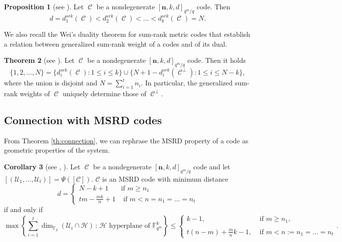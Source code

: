 \documentclass[11pt]{amsart}
\DeclareMathOperator{\C}{\mathcal{C}}
\theoremstyle{definition}
\newtheorem{theorem}{Theorem}[section]
\newtheorem{corollary}[theorem]{Corollary}
\newtheorem{proposition}[theorem]{Proposition}
\newcommand{\F}{{\mathbb F}}
\newcommand{\bfn}{\mathbf {n}}
\newcommand{\fq}{{\mathbb F}_{q}}
\newcommand{\Fmnkd}{[\bfn,k,d]_{q^m/q}}
\newcommand{\st}{\,:\,}
\begin{document}
\begin{proposition} [see \textnormal{\cite[Lemma 4]{martinez2019theory}}] \label{prop:monotonweight}
    Let $\C$ be a nondegenerate $\Fmnkd$ code. Then 
    \[
    d=d_1^{srk}(\C)<d_2^{srk}(\C)<\ldots<d_k^{srk}(\C)=N.
    \]
\end{proposition}

 We also recall the Wei's duality theorem for sum-rank metric codes that establish a relation between generalized sum-rank weight of a codes and of its dual.

\begin{theorem} [see \textnormal{\cite[Theorem 2]{martinez2019theory}}] \label{th:weitype}
    Let $\C$ be a nondegenerate $\Fmnkd$ code. Then it holds
    \[
    \{1,2,\ldots,N\}=\{d_i^{srk}(\C) \colon 1 \leq i \leq k \} \cup \{N+1-d_i^{srk}(\C^{\perp}) \colon 1 \leq i \leq N-k \},
    \]
    where the union is disjoint and $N=\sum_{i=1}^t n_i$. In particular, the generalized sum-rank weights of $\C$ uniquely determine those of $\C^{\perp}$.
\end{theorem}

\subsection{Connection with MSRD codes}


From Theorem \ref{th:connection}, we can rephrase the MSRD property of a code as geometric properties of the system.

\begin{corollary} [see \textnormal{\cite[Corollary 3.10]{neri2023geometry}, \cite[Theorem 6.10]{santonastaso2022subspace}}]\label{teo:designMSRD} 
Let $\C$ be a nondegenerate $\Fmnkd$ code and let $[(\mathcal{U}_1,\ldots,\mathcal{U}_t)]=\Psi([\mathcal{C}])$. $\mathcal{C}$ is an MSRD code with minimum distance \[
	d = \begin{cases} N-k+1 &  \mbox{if }m \geq n_1
		 \\
 tm-\frac{mk}{n}+1 &\mbox{ if }m<n=n_1=\ldots=n_t
	\end{cases}
	\] if and only if 
\[
\max\left\{ \sum_{i=1}^t \dim_{\fq}(\mathcal{U}_i \cap \mathcal{H})  \st \mathcal{H} \mbox{ hyperplane of }\F_{q^m}^k  \right\} \leq \begin{cases}
k-1, & \mbox{ if } m \geq n_1, \\ \\
t(n-m)+\frac{m}{n}k-1, & \mbox{ if } m<n:=n_1=\ldots=n_t
\end{cases}.
\]
\end{corollary}
\end{document}
